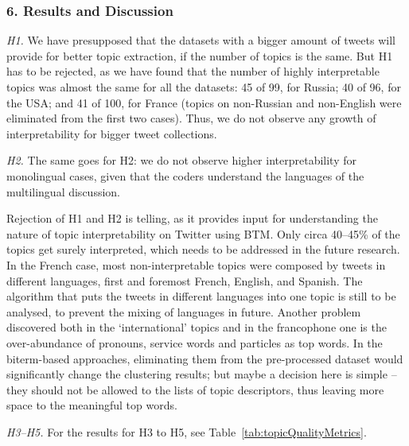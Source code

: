 \subsubsection{6. Results and Discussion}

\textit{H1.} We have presupposed that the datasets with a bigger amount of tweets will provide for better topic extraction, if the number of topics is the same. But H1 has to be rejected, as we have found that the number of highly interpretable topics was almost the same for all the datasets: 45 of 99, for Russia; 40 of 96, for the USA; and 41 of 100, for France (topics on non-Russian and non-English were eliminated from the first two cases). Thus, we do not observe any growth of interpretability for bigger tweet collections.

\textit{H2.} The same goes for H2: we do not observe higher interpretability for monolingual cases, given that the coders understand the languages of the multilingual discussion.

Rejection of H1 and H2 is telling, as it provides input for understanding the nature of topic interpretability on Twitter using BTM. Only circa 40--45\% of the topics get surely interpreted, which needs to be addressed in the future research. In the French case, most non-interpretable topics were composed by tweets in different languages, first and foremost French, English, and Spanish. The algorithm that puts the tweets in different languages into one topic is still to be analysed, to prevent the mixing of languages in future. Another problem discovered both in the ‘international’ topics and in the francophone one is the over-abundance of pronouns, service words and particles as top words. In the biterm-based approaches, eliminating them from the pre-processed dataset would significantly change the clustering results; but maybe a decision here is simple -- they should not be allowed to the lists of topic descriptors, thus leaving more space to the meaningful top words.

\textit{H3--H5.} For the results for H3 to H5, see Table~\cref{tab:topicQualityMetrics}.


